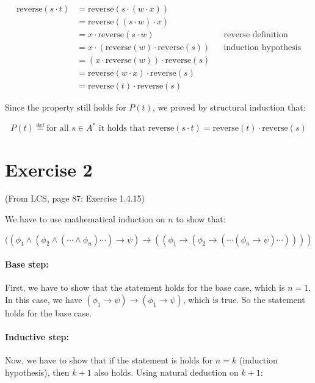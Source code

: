 \documentclass[11pt]{article}
\begin{document}
\begin{align*}
    \text{reverse}(s \cdot t) &= \text{reverse}(s \cdot (w \cdot x)) \\
    &= \text{reverse}((s \cdot w) \cdot x) \\
    &= x \cdot \text{reverse}(s \cdot w) && \text{reverse definition}\\
    &= x \cdot (\text{reverse}(w) \cdot \text{reverse}(s)) && \text{induction hypothesis}\\
    &= (x \cdot \text{reverse}(w)) \cdot \text{reverse}(s) \\
    &= \text{reverse} (w \cdot x) \cdot \text{reverse}(s) \\
    &= \text{reverse}(t) \cdot \text{reverse}(s)
\end{align*}

Since the property still holds for $P(t)$, we proved by structural induction that:

$$P(t) \stackrel{\text{def}}{=} \text{for all }s\in A^* \text{ it holds that reverse}(s \cdot t) = \text{reverse}(t) \cdot \text{reverse}(s)$$

\section*{Exercise 2}
(From LCS, page 87: Exercise 1.4.15)

We have to use mathematical induction on $n$ to show that:

$$((\phi_1 \land ( \phi_2 \land (\cdots \land \phi_n) \cdots) \to \psi) \to ((\phi_1 \to (\phi_2 \to (\cdots (\phi_n \to \psi) \cdots))))$$

\paragraph*{Base step:} First, we have to show that the statement holds for the base case, which is $n = 1$. In this case, we have $(\phi_1 \to \psi) \to (\phi_1 \to \psi)$, which is true. So the statement holds for the base case.

\paragraph*{Inductive step:} Now, we have to show that if the statement is holds for $n=k$ (induction hypothesis), then $k+1$ also holds. Using natural deduction on $k + 1$:
\end{document}
